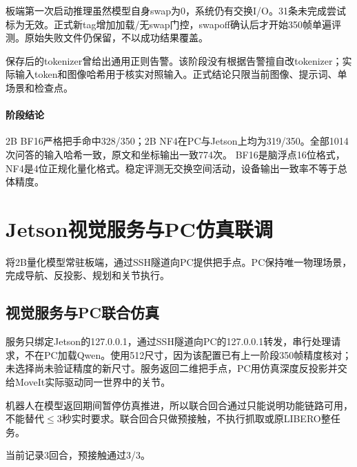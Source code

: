 板端第一次启动推理虽然模型自身swap为0，系统仍有交换I/O。31条未完成尝试标为无效。正式新tag增加加载/无swap门控，swapoff确认后才开始350帧单遍评测。原始失败文件仍保留，不以成功结果覆盖。

保存后的tokenizer曾给出通用正则告警。该阶段没有根据告警擅自改tokenizer；实际输入token和图像哈希用于核实对照输入。正式结论只限当前图像、提示词、单场景和检查点。


\paragraph{阶段结论}2B BF16严格把手命中328/350；2B NF4在PC与Jetson上均为319/350。全部1014次问答的输入哈希一致，原文和坐标输出一致774次。 BF16是脑浮点16位格式，NF4是4位正规化量化格式。稳定评测无交换空间活动，设备输出一致率不等于总体精度。


\FloatBarrier

\section{Jetson视觉服务与PC仿真联调}

\label{stage:s23}

将2B量化模型常驻板端，通过SSH隧道向PC提供把手点。PC保持唯一物理场景，完成导航、反投影、规划和关节执行。

\subsection{视觉服务与PC联合仿真}\label{s23-detail-1}

服务只绑定Jetson的127.0.0.1，通过SSH隧道向PC的127.0.0.1转发，串行处理请求，不在PC加载Qwen。使用512尺寸，因为该配置已有上一阶段350帧精度核对；未选择尚未验证精度的新尺寸。服务返回二维把手点，PC用仿真深度反投影并交给MoveIt实际驱动同一世界中的关节。

机器人在模型返回期间暂停仿真推进，所以联合回合通过只能说明功能链路可用，不能替代\(\leq\)3秒实时要求。联合回合只做预接触，不执行抓取或原LIBERO整任务。

当前记录3回合，预接触通过3/3。

